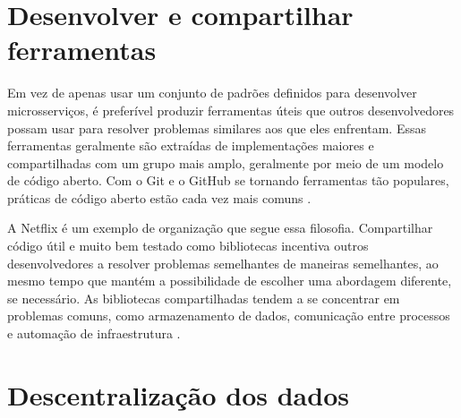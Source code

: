 

\section{Desenvolver e compartilhar ferramentas}
Em vez de apenas usar um conjunto de padrões definidos para desenvolver microsserviços, é preferível produzir ferramentas úteis que outros desenvolvedores possam usar para resolver problemas similares aos que eles enfrentam. Essas ferramentas geralmente são extraídas de implementações maiores e compartilhadas com um grupo mais amplo, geralmente por meio de um modelo de código aberto. Com o Git e o GitHub se tornando ferramentas tão populares, práticas de código aberto estão cada vez mais comuns \cite{martin-fowler-microservices}.


A Netflix é um exemplo de organização que segue essa filosofia. Compartilhar código útil e muito bem testado como bibliotecas incentiva outros desenvolvedores a resolver problemas semelhantes de maneiras semelhantes, ao mesmo tempo que mantém a possibilidade de escolher uma abordagem diferente, se necessário. As bibliotecas compartilhadas tendem a se concentrar em problemas comuns, como armazenamento de dados, comunicação entre processos e automação de infraestrutura \cite{martin-fowler-microservices}.

\section{Descentralização dos dados}\label{descentralizacao-dados}

